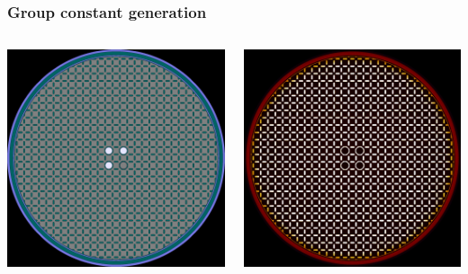 \begin{frame}
  \frametitle{Group constant generation}
    \begin{columns}

    \column[t]{5cm}

    \column[t]{3.7cm}
    \includegraphics[width=\textwidth]{msregeom}

    \includegraphics[width=\textwidth]{msremesh}

    \end{columns}


\end{frame}
